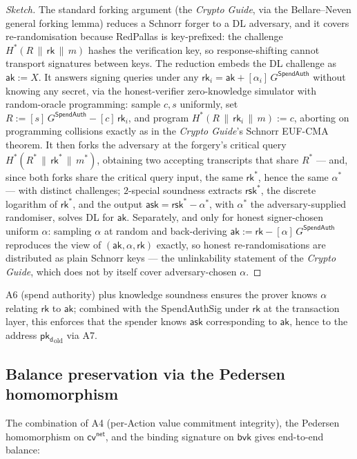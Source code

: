 \documentclass[11pt,a4paper]{article}
\theoremstyle{definition}
\newcommand{\cvsym}{\mathsf{cv}}
\newcommand{\rk}{\mathsf{rk}}
\newcommand{\ask}{\ensuremath{\mathsf{ask}}}
\newcommand{\aksym}{\ensuremath{\mathsf{ak}}}
\newcommand{\pkd}{\ensuremath{\mathsf{pk_d}}}
\newcommand{\rsk}{\ensuremath{\mathsf{rsk}}}
\begin{document}
\begin{proof}[Sketch]
The standard forking argument (the \emph{Crypto Guide}, via the
Bellare--Neven general forking lemma) reduces a Schnorr forger to a DL adversary, and
it covers re-randomisation because RedPallas is key-prefixed: the
challenge $H^*(R \,\|\, \rk \,\|\, m)$ hashes the verification key, so
response-shifting cannot transport signatures between keys. The reduction
embeds the DL challenge as $\aksym := X$. It answers signing queries under
any $\rk_i = \aksym + [\alpha_i]\, G^{\mathsf{SpendAuth}}$ without knowing
any secret, via the honest-verifier zero-knowledge simulator with
random-oracle programming: sample $c, s$ uniformly, set
$R := [s]\, G^{\mathsf{SpendAuth}} - [c]\, \rk_i$, and program
$H^*(R \,\|\, \rk_i \,\|\, m) := c$, aborting on programming collisions
exactly as in the \emph{Crypto Guide}'s Schnorr EUF-CMA theorem. It then
forks the adversary at the forgery's critical query
$H^*(R^* \,\|\, \rk^* \,\|\, m^*)$, obtaining two accepting transcripts
that share $R^*$ --- and, since both forks share the critical query input,
the same $\rk^*$, hence the same $\alpha^*$ --- with distinct challenges;
$2$-special soundness extracts $\rsk^*$, the discrete logarithm of
$\rk^*$, and the output $\ask = \rsk^* - \alpha^*$, with $\alpha^*$ the
adversary-supplied randomiser, solves DL for $\aksym$. Separately, and
only for honest signer-chosen uniform $\alpha$: sampling $\alpha$ at
random and back-deriving $\aksym := \rk - [\alpha]\, G^{\mathsf{SpendAuth}}$
reproduces the view of $(\aksym, \alpha, \rk)$ exactly, so honest
re-randomisations are distributed as plain Schnorr keys --- the
unlinkability statement of the \emph{Crypto Guide}, which does not by
itself cover adversary-chosen $\alpha$.
\end{proof}

A6 (spend authority) plus knowledge soundness ensures the prover knows
$\alpha$ relating $\rk$ to $\aksym$; combined with the SpendAuthSig
under $\rk$ at the transaction layer, this enforces that the spender
knows $\ask$ corresponding to $\aksym$, hence to the address
$\pkd_{\mathrm{old}}$ via A7.

\subsection{Balance preservation via the Pedersen homomorphism}\label{sec:balance}

The combination of A4 (per-Action value commitment integrity), the
Pedersen homomorphism on $\cvsym^{\mathsf{net}}$, and the binding
signature on $\mathsf{bvk}$ gives end-to-end balance:
\end{document}
